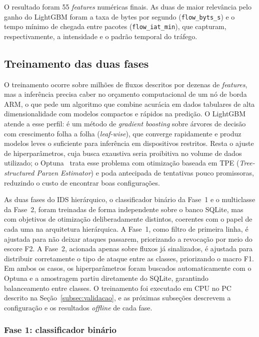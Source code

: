 \documentclass[12pt,a4paper]{article}
\begin{document}
O resultado foram 55 \textit{features} numéricas finais. As duas de maior
relevância pelo ganho do LightGBM foram a taxa de bytes por segundo
(\texttt{flow\_byts\_s}) e o tempo mínimo de chegada entre pacotes
(\texttt{flow\_iat\_min}), que capturam, respectivamente, a intensidade e o
padrão temporal do tráfego.

\subsection{Treinamento das duas fases}
\label{subsec:treinamento}

O treinamento ocorre sobre milhões de fluxos descritos por dezenas de
\textit{features}, mas a inferência precisa caber no orçamento computacional de
um nó de borda ARM, o que pede um algoritmo que combine acurácia em dados
tabulares de alta dimensionalidade com modelos compactos e rápidos na predição.
O LightGBM~\cite{ke:17} atende a esse perfil: é um método de \textit{gradient
boosting} sobre árvores de decisão com crescimento folha a folha
(\textit{leaf-wise}), que converge rapidamente e produz modelos leves o
suficiente para inferência em dispositivos restritos. Resta o ajuste de
hiperparâmetros, cuja busca exaustiva seria proibitiva no volume de dados
utilizado; o Optuna~\cite{akiba:19} trata esse problema com otimização baseada
em TPE (\textit{Tree-structured Parzen Estimator}) e poda antecipada de
tentativas pouco promissoras, reduzindo o custo de encontrar boas configurações.

As duas fases do IDS hierárquico, o classificador binário da Fase~1 e o
multiclasse da Fase~2, foram treinadas de forma independente sobre o banco
SQLite, mas com objetivos de otimização deliberadamente distintos, coerentes com
o papel de cada uma na arquitetura hierárquica. A Fase~1, como filtro de
primeira linha, é ajustada para não deixar ataques passarem, priorizando a
revocação por meio do escore F2. A Fase~2, acionada apenas sobre fluxos já
sinalizados, é ajustada para distribuir corretamente o tipo de ataque entre as
classes, priorizando o macro F1. Em ambos os casos, os hiperparâmetros foram
buscados automaticamente com o Optuna e a amostragem partiu diretamente do
SQLite, garantindo balanceamento entre classes. O treinamento foi executado em
CPU no PC descrito na Seção~\ref{subsec:validacao}, e as próximas subseções
descrevem a configuração e os resultados \textit{offline} de cada fase.

\subsubsection{Fase 1: classificador binário}
\end{document}
